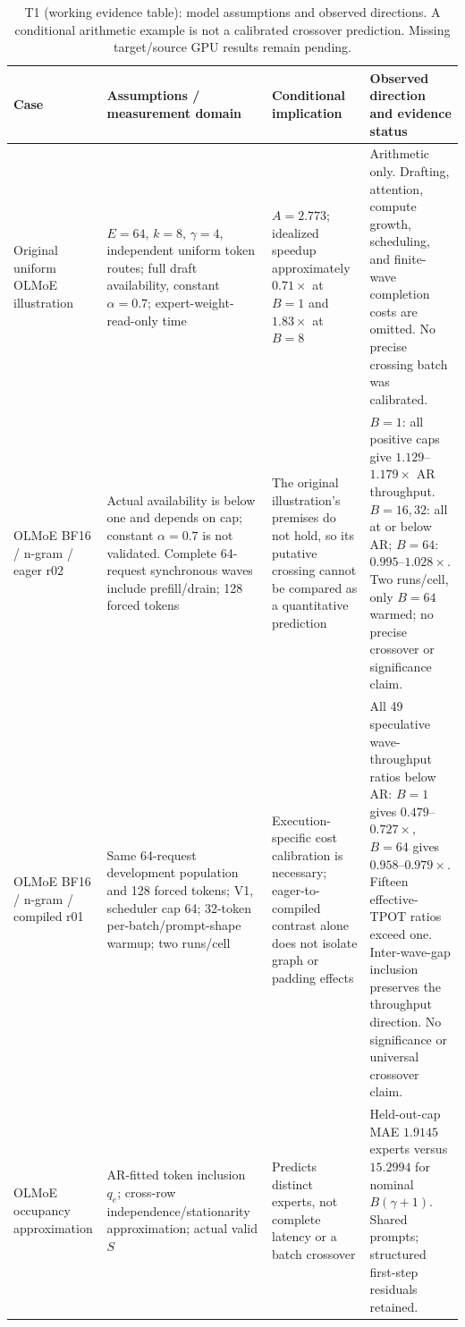 \begin{table}[t]
\centering\small
\caption{T1 (working evidence table): model assumptions and observed directions. A conditional arithmetic example is not a calibrated crossover prediction. Missing target/source GPU results remain pending.}
\label{tab:t1directions}
\begin{tabularx}{\textwidth}{@{}p{}p{}p{}X@{}}
\toprule
Case & Assumptions / measurement domain & Conditional implication & Observed direction and evidence status \\\midrule
Original uniform OLMoE illustration & $E=64$, $k=8$, $\gamma=4$, independent uniform token routes; full draft availability, constant $\alpha=0.7$; expert-weight-read-only time & $A=2.773$; idealized speedup approximately $0.71\times$ at $B=1$ and $1.83\times$ at $B=8$ & Arithmetic only. Drafting, attention, compute growth, scheduling, and finite-wave completion costs are omitted. No precise crossing batch was calibrated. \\
OLMoE BF16 / n-gram / eager r02 & Actual availability is below one and depends on cap; constant $\alpha=0.7$ is not validated. Complete 64-request synchronous waves include prefill/drain; 128 forced tokens & The original illustration's premises do not hold, so its putative crossing cannot be compared as a quantitative prediction & $B=1$: all positive caps give $1.129$--$1.179\times$ AR throughput. $B=16,32$: all at or below AR; $B=64$: $0.995$--$1.028\times$. Two runs/cell, only $B=64$ warmed; no precise crossover or significance claim. \\
OLMoE BF16 / n-gram / compiled r01 & Same 64-request development population and 128 forced tokens; V1, scheduler cap 64; 32-token per-batch/prompt-shape warmup; two runs/cell & Execution-specific cost calibration is necessary; eager-to-compiled contrast alone does not isolate graph or padding effects & All 49 speculative wave-throughput ratios below AR: $B=1$ gives $0.479$--$0.727\times$, $B=64$ gives $0.958$--$0.979\times$. Fifteen effective-TPOT ratios exceed one. Inter-wave-gap inclusion preserves the throughput direction. No significance or universal crossover claim. \\
OLMoE occupancy approximation & AR-fitted token inclusion $q_e$; cross-row independence/stationarity approximation; actual valid $S$ & Predicts distinct experts, not complete latency or a batch crossover & Held-out-cap MAE $1.9145$ experts versus $15.2994$ for nominal $B(\gamma+1)$. Shared prompts; structured first-step residuals retained. \\

\end{tabularx}
\end{table}
